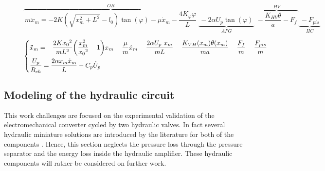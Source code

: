 \documentclass[3p,twocolumn,preprint]{elsarticle}
\begin{document}
\begin{figure}
\begin{equation}
\overbrace{\ m \ddot{x}_m =-2K(\sqrt{x_m^2+L^2}-l_0)\tan(\varphi) 
							-\mu \dot{x}_m
							-\frac{4K_{\varphi}\varphi}{L}\ }^{OB}
			\underbrace{\ -2\alpha U_p \tan(\varphi)\ }_{APG}		 
			\overbrace{\ -\dfrac{K_{HV}\theta}{a} - F_f\ }^{HV}
			\underbrace{\ -F_{pis}\ }_{HC}
\label{eq:OB-GPA}
\end{equation}
\end{figure}
\begin{figure}
\begin{equation}
	\begin{dcases}
\ddot{x}_m = - \frac{2K{x_0}^2}{mL^2}\biggl(\frac{x_m^2}{{x_0}^2} -1\biggr)
			   x_m - \frac{\mu}{m}\dot{x}_m - \frac{2\alpha U_p\ x_m}{mL}
			-\frac{K_{VH}(x_m)\theta(x_m)}{ma}
			-\frac{F_f}{m}
			-\frac{F_{pis}}{m} \\
\dfrac{U_p}{R_{ch}} = \frac{2\alpha x_m \dot{x}_m}{L} - C_p\dot{U}_p
	\end{dcases}
	\label{eq:OB+GPA+VH+piston}	
\end{equation}
\end{figure}
	\subsection{Modeling of the hydraulic circuit}	
	\label{subsec:The hydraulic circuit}
This work challenges are focused on the experimental validation of the electromechanical converter cycled by two hydraulic valves. In fact several hydraulic miniature solutions are introduced by the literature for both of the components \cite{Wang2020,Xu2021,Zhu2013}. Hence, this section neglects the pressure loss through the pressure separator and the energy loss inside the hydraulic amplifier. These hydraulic components will rather be considered on further work.
\end{document}
